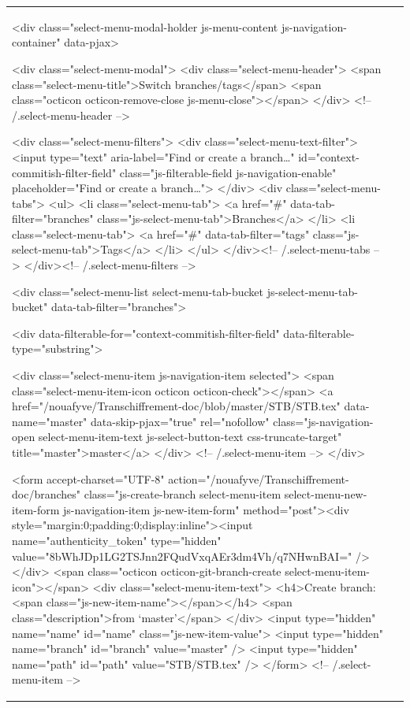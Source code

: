 \documentclass[a4paper,11pt,french]{article}
\begin{document}
\begin{tabular}{|m{8cm}|m{8cm}|}
  <div class="select-menu-modal-holder js-menu-content js-navigation-container" data-pjax>

    <div class="select-menu-modal">
      <div class="select-menu-header">
        <span class="select-menu-title">Switch branches/tags</span>
        <span class="octicon octicon-remove-close js-menu-close"></span>
      </div> <!-- /.select-menu-header -->

      <div class="select-menu-filters">
        <div class="select-menu-text-filter">
          <input type="text" aria-label="Find or create a branch…" id="context-commitish-filter-field" class="js-filterable-field js-navigation-enable" placeholder="Find or create a branch…">
        </div>
        <div class="select-menu-tabs">
          <ul>
            <li class="select-menu-tab">
              <a href="#" data-tab-filter="branches" class="js-select-menu-tab">Branches</a>
            </li>
            <li class="select-menu-tab">
              <a href="#" data-tab-filter="tags" class="js-select-menu-tab">Tags</a>
            </li>
          </ul>
        </div><!-- /.select-menu-tabs -->
      </div><!-- /.select-menu-filters -->

      <div class="select-menu-list select-menu-tab-bucket js-select-menu-tab-bucket" data-tab-filter="branches">

        <div data-filterable-for="context-commitish-filter-field" data-filterable-type="substring">


            <div class="select-menu-item js-navigation-item selected">
              <span class="select-menu-item-icon octicon octicon-check"></span>
              <a href="/nouafyve/Transchiffrement-doc/blob/master/STB/STB.tex"
                 data-name="master"
                 data-skip-pjax="true"
                 rel="nofollow"
                 class="js-navigation-open select-menu-item-text js-select-button-text css-truncate-target"
                 title="master">master</a>
            </div> <!-- /.select-menu-item -->
        </div>

          <form accept-charset="UTF-8" action="/nouafyve/Transchiffrement-doc/branches" class="js-create-branch select-menu-item select-menu-new-item-form js-navigation-item js-new-item-form" method="post"><div style="margin:0;padding:0;display:inline"><input name="authenticity_token" type="hidden" value="8bWhJDp1LG2TSJnn2FQudVxqAEr3dm4Vh/q7NHwnBAI=" /></div>
            <span class="octicon octicon-git-branch-create select-menu-item-icon"></span>
            <div class="select-menu-item-text">
              <h4>Create branch: <span class="js-new-item-name"></span></h4>
              <span class="description">from ‘master’</span>
            </div>
            <input type="hidden" name="name" id="name" class="js-new-item-value">
            <input type="hidden" name="branch" id="branch" value="master" />
            <input type="hidden" name="path" id="path" value="STB/STB.tex" />
          </form> <!-- /.select-menu-item -->


\end{tabular}
\end{document}
